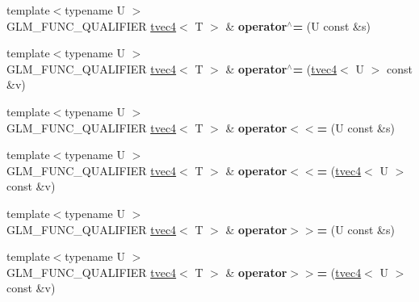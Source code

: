 \begin{DoxyCompactItemize}
\item 
\hypertarget{structglm_1_1detail_1_1tvec4_aaac80b76e60f293836cc4fe823a5bb2a}{}{\footnotesize template$<$typename U $>$ }\\G\+L\+M\+\_\+\+F\+U\+N\+C\+\_\+\+Q\+U\+A\+L\+I\+F\+I\+E\+R \hyperlink{structglm_1_1detail_1_1tvec4}{tvec4}$<$ T $>$ \& {\bfseries operator$^\wedge$=} (U const \&s)\label{structglm_1_1detail_1_1tvec4_aaac80b76e60f293836cc4fe823a5bb2a}

\item 
\hypertarget{structglm_1_1detail_1_1tvec4_ad9a6686cce4a8538d309670511a42f8e}{}{\footnotesize template$<$typename U $>$ }\\G\+L\+M\+\_\+\+F\+U\+N\+C\+\_\+\+Q\+U\+A\+L\+I\+F\+I\+E\+R \hyperlink{structglm_1_1detail_1_1tvec4}{tvec4}$<$ T $>$ \& {\bfseries operator$^\wedge$=} (\hyperlink{structglm_1_1detail_1_1tvec4}{tvec4}$<$ U $>$ const \&v)\label{structglm_1_1detail_1_1tvec4_ad9a6686cce4a8538d309670511a42f8e}

\item 
\hypertarget{structglm_1_1detail_1_1tvec4_abcccdf85cc0ba74ff62f55e9fe289724}{}{\footnotesize template$<$typename U $>$ }\\G\+L\+M\+\_\+\+F\+U\+N\+C\+\_\+\+Q\+U\+A\+L\+I\+F\+I\+E\+R \hyperlink{structglm_1_1detail_1_1tvec4}{tvec4}$<$ T $>$ \& {\bfseries operator$<$$<$=} (U const \&s)\label{structglm_1_1detail_1_1tvec4_abcccdf85cc0ba74ff62f55e9fe289724}

\item 
\hypertarget{structglm_1_1detail_1_1tvec4_a502c2ad52eebe3e35e39c3209d55ce77}{}{\footnotesize template$<$typename U $>$ }\\G\+L\+M\+\_\+\+F\+U\+N\+C\+\_\+\+Q\+U\+A\+L\+I\+F\+I\+E\+R \hyperlink{structglm_1_1detail_1_1tvec4}{tvec4}$<$ T $>$ \& {\bfseries operator$<$$<$=} (\hyperlink{structglm_1_1detail_1_1tvec4}{tvec4}$<$ U $>$ const \&v)\label{structglm_1_1detail_1_1tvec4_a502c2ad52eebe3e35e39c3209d55ce77}

\item 
\hypertarget{structglm_1_1detail_1_1tvec4_a61576671c163d89728eafa5adf25598b}{}{\footnotesize template$<$typename U $>$ }\\G\+L\+M\+\_\+\+F\+U\+N\+C\+\_\+\+Q\+U\+A\+L\+I\+F\+I\+E\+R \hyperlink{structglm_1_1detail_1_1tvec4}{tvec4}$<$ T $>$ \& {\bfseries operator$>$$>$=} (U const \&s)\label{structglm_1_1detail_1_1tvec4_a61576671c163d89728eafa5adf25598b}

\item 
\hypertarget{structglm_1_1detail_1_1tvec4_a767cc5a96867c44d95f7d971e40e5903}{}{\footnotesize template$<$typename U $>$ }\\G\+L\+M\+\_\+\+F\+U\+N\+C\+\_\+\+Q\+U\+A\+L\+I\+F\+I\+E\+R \hyperlink{structglm_1_1detail_1_1tvec4}{tvec4}$<$ T $>$ \& {\bfseries operator$>$$>$=} (\hyperlink{structglm_1_1detail_1_1tvec4}{tvec4}$<$ U $>$ const \&v)\label{structglm_1_1detail_1_1tvec4_a767cc5a96867c44d95f7d971e40e5903}

\end{DoxyCompactItemize}
